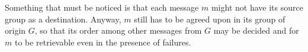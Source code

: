 \documentclass[times, 10pt]{article}
\begin{document}
Something that must be noticed is that each message $m$ might not have its source group as a destination. Anyway, $m$ still has to be agreed upon in its group of origin $G$, so that its order among other messages from $G$ may be decided and for %
$m$ to be retrievable even in the presence of failures.%
\end{document}
